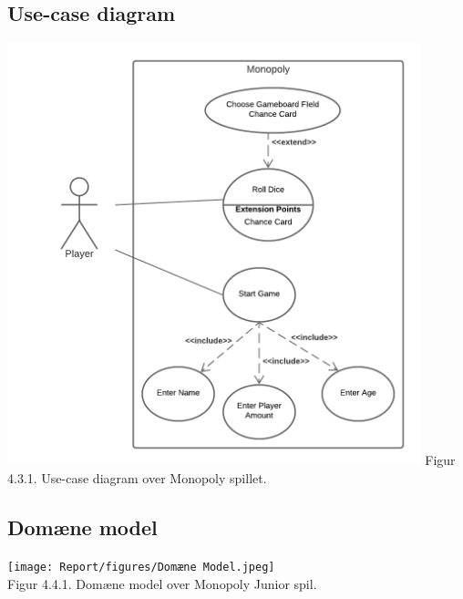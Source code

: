 \begin{flushleft}
\subsection{Use-case diagram}
\includegraphics[width=0.9\textwidth]{Report/figures/Use case diagram CDIO del3.png}
Figur 4.3.1. Use-case diagram over Monopoly spillet.

\subsection{Domæne model}
\texttt{[image: Report/figures/Domæne Model.jpeg]}~\\[1cm]
Figur 4.4.1. Domæne model over Monopoly Junior spil.


\end{flushleft}

